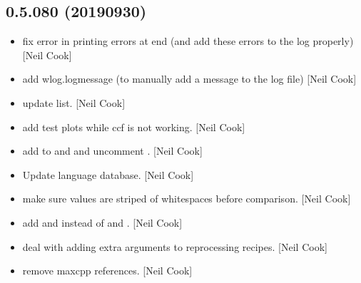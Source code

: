 \documentclass[a4paper,10pt,english]{report}
\begin{document}
\subsection{0.5.080 (2019\sphinxhyphen{}09\sphinxhyphen{}30)}
\label{\detokenize{misc/changelog:id81}}\begin{itemize}
\item {} 
 \sphinxhyphen{} fix error in printing errors at
end (and add these errors to the log properly) {[}Neil Cook{]}

\item {} 
 \sphinxhyphen{} add wlog.logmessage (to manually add a message
to the log file) {[}Neil Cook{]}

\item {} 
 \sphinxhyphen{} update list. {[}Neil Cook{]}

\item {} 
 \sphinxhyphen{} add test plots while ccf is
not working. {[}Neil Cook{]}

\item {} 
 \sphinxhyphen{} add  to 
and  and uncomment . {[}Neil Cook{]}

\item {} 
Update language database. {[}Neil Cook{]}

\item {} 
 \sphinxhyphen{} make sure values are striped of whitespaces
before comparison. {[}Neil Cook{]}

\item {} 
 \sphinxhyphen{} add  and
 instead of  and
. {[}Neil Cook{]}

\item {} 
 \sphinxhyphen{} deal with adding extra arguments
to reprocessing recipes. {[}Neil Cook{]}

\item {} 
 \sphinxhyphen{} remove maxcpp references. {[}Neil Cook{]}


\end{itemize}
\end{document}
